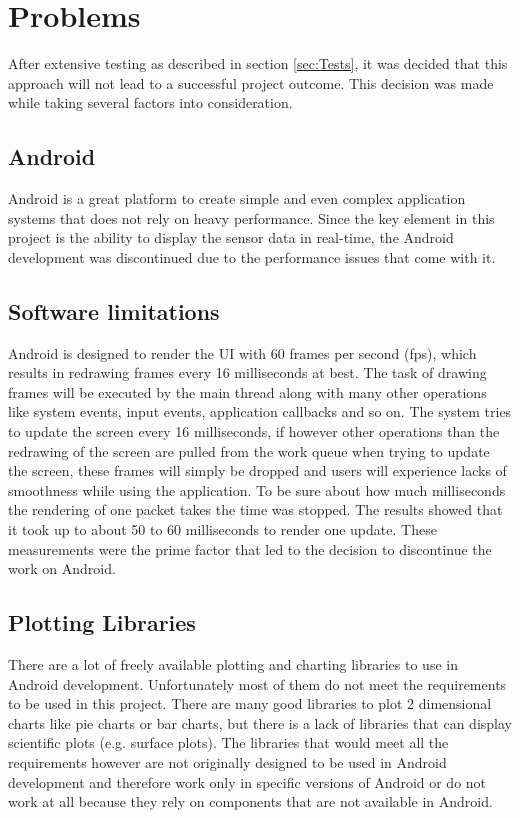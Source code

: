 \chapter{Problems}
\label{ch:Problems}

\author{Nico Leidenfrost}
%
After extensive testing as described in section \vref{sec:Tests}, it was decided that this approach will not lead to a successful project outcome. This decision was made while taking several factors into consideration.

\section{Android}
Android is a great platform to create simple and even complex application systems that does not rely on heavy performance. Since the key element in this project is the ability to display the sensor data in real-time, the Android development was discontinued due to the performance issues that come with it.

\section{Software limitations}
Android is designed to render the UI with 60 frames per second (fps), which results in redrawing frames every 16 milliseconds at best. The task of drawing frames will be executed by the main thread along with many other operations like system events, input events, application callbacks and so on. The system tries to update the screen every 16 milliseconds, if however other operations than the redrawing of the screen are pulled from the work queue when trying to update the screen, these frames will simply be dropped and users will experience lacks of smoothness while using the application. To be sure about how much milliseconds the rendering of one packet takes the time was stopped. The results showed that it took up to about 50 to 60 milliseconds to render one update. These measurements were the prime factor that led to the decision to discontinue the work on Android.

\section{Plotting Libraries}
There are a lot of freely available plotting and charting libraries to use in Android development. Unfortunately most of them do not meet the requirements to be used in this project. There are many good libraries to plot 2 dimensional charts like pie charts or bar charts, but there is a lack of libraries that can display scientific plots (e.g. surface plots). The libraries that would meet all the requirements however are not originally designed to be used in Android development and therefore work only in specific versions of Android or do not work at all because they rely on components that are not available in Android.

